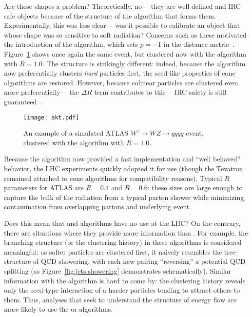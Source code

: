 



Are these shapes a problem? Theoretically, no--- they are well defined and IRC safe objects because of the structure of the algorithm that forms them. Experimentally, this was less clear--- was it possible to calibrate an object that whose shape was so sensitive to soft radiation? Concerns such as these motivated the introduction of the \antikt algorithm, which sets $p=-1$ in the distance metric~\cite{Jetography}. Figure~\ref{fig:jets:akt} shows once again the same event, but clustered now with the \antikt algorithm with $R=1.0$. The structure is strikingly different: indeed, because the algorithm now preferentially clusters \textit{hard} particles first, the seed-like properties of cone algorithms are restored. However, because colinear particles are clustered even more preferentially--- the $\Delta R$ term contributes to this--- IRC safety is still guaranteed~\cite{Jetography}.




\begin{figure}
\centering
\texttt{[image: akt.pdf]}
\caption{An example of a simulated ATLAS $W'\rightarrow WZ\rightarrow qqqq$ event, clustered with the \antikt algorithm with $R=1.0$.}
\label{fig:jets:akt}
\end{figure}


Because the \antikt algorithm now provided a fast implementation and ``well behaved'' behavior, the LHC experiments quickly adopted it for use (though the Tevatron remained attached to cone algorithms for compatibility reasons). Typical $R$ parameters for ATLAS are $R=0.4$ and $R=0.6$: these sizes are large enough to capture the bulk of the radiation from a typical parton shower while minimizing contamination from overlapping partons and underlying event.


Does this mean that \kt and \CA algorithms have no use at the LHC? On the contrary, there are situations where they provide more information than \antikt. For example, the branching structure (or the clustering history) in these algorithms is considered meaningful: as softer particles are clustered first, it naively resembles the tree-structure of QCD showering, with each new pairing ``reversing'' a potential QCD splitting (as Figure~\ref{fig:jets:showering} demonstrates schematically). Similar information with the \antikt algorithm is hard to come by: the clustering history reveals only the seed-type interaction of a harder particles tending to attract others to them. Thus, analyses that seek to understand the structure of energy flow are more likely to use the \kt or \CA algorithms.


